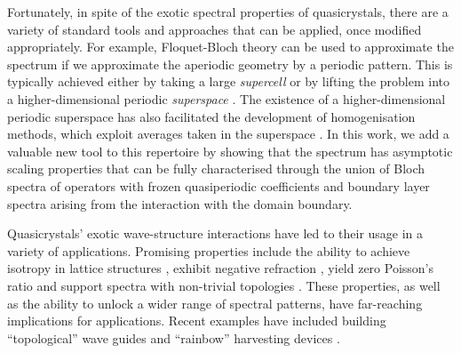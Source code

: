 \documentclass[a4paper,reqno]{amsart}
\numberwithin{equation}{section}
\numberwithin{equation}{section}		%
\numberwithin{figure}{section}			%
\numberwithin{table}{section}				%
\theoremstyle{definition}
\newcommand{\<}{\ensuremath \leq}
\renewcommand{\>}{\ensuremath \geq}
\begin{document}
Fortunately, in spite of the exotic spectral properties of quasicrystals, there are a variety of standard tools and approaches that can be applied, once modified appropriately. For example, Floquet-Bloch theory can be used to approximate the spectrum if we approximate the aperiodic geometry by a periodic pattern. This is typically achieved either by taking a large \textit{supercell} \cite{davies2025convergence, davies2024super, shubin1978almost, Damanik2016, Avron1990,guenneau2008acoustic} or by lifting the problem into a higher-dimensional periodic \textit{superspace} \cite{rodriguez2008computation, davies2025convergence}. The existence of a higher-dimensional periodic superspace has also facilitated the development of homogenisation methods, which exploit averages taken in the superspace \cite{Bouchitte+etal2010,wellander2018two}. In this work, we add a valuable new tool to this repertoire by showing that the spectrum has asymptotic scaling properties that can be fully characterised through the union of Bloch spectra of operators with frozen quasiperiodic coefficients and boundary layer spectra arising from the interaction with the domain boundary.
 

Quasicrystals' exotic wave-structure interactions have led to their usage in a variety of applications. Promising properties include the ability to achieve isotropy in lattice structures \cite{chen2020isotropic, wang2020quasiperiodic}, exhibit negative refraction \cite{morini2019negative}, yield zero Poisson's ratio \cite{clarke2023isotropic} and support spectra with non-trivial topologies \cite{kraus2012topological, liu2022topological}. These properties, as well as the ability to unlock a wider range of spectral patterns, have far-reaching implications for applications. Recent examples have included building ``topological'' wave guides \cite{kraus2012topological, Davies2022, beli2023interface} and ``rainbow'' harvesting devices \cite{davies2023graded}.
\end{document}
